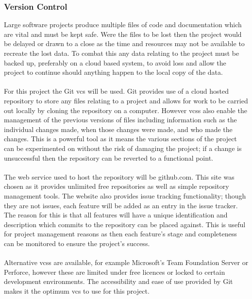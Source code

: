 	\subsubsection{Version Control}
		Large software projects produce multiple files of code and documentation which are vital and must be kept safe. Were the files to be lost then the project would be delayed or drawn to a close as the time and resources may not be available to recreate the lost data. To combat this any data relating to the project must be backed up, preferably on a cloud based system, to avoid loss and allow the project to continue should anything happen to the local copy of the data.
		\\\\
		For this project the Git \gls{vcs} will be used. Git provides use of a cloud hosted repository to store any files relating to a project and allows for work to be carried out locally by cloning the repository on a computer. However \glspl{vcs} also enable the management of the previous versions of files including information such as the individual changes made, when those changes were made, and who made the changes. This is a powerful tool as it means the various sections of the project can be experimented on without the risk of damaging the project; if a change is unsuccessful then the repository can be reverted to a functional point.
		\\\\
		The web service used to host the repository will be github.com. This site was chosen as it provides unlimited free repositories as well as simple repository management tools. The website also provides issue tracking functionality; though they are not issues, each feature will be added as an entry in the issue tracker. The reason for this is that all features will have a unique identification and description which commits to the repository can be placed against. This is useful for project management reasons as then each feature's stage and completeness can be monitored to ensure the project's success.
		\\\\
		Alternative \glspl{vcs} are available, for example Microsoft's Team Foundation Server or Perforce, however these are limited under free licences or locked to certain development environments. The accessibility and ease of use provided by Git makes it the optimum \gls{vcs} to use for this project. 
